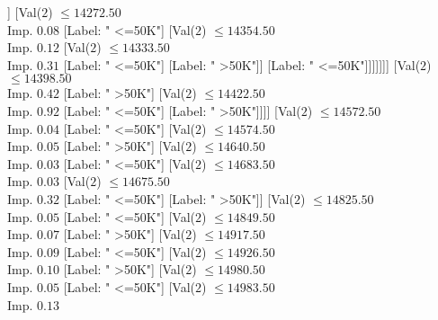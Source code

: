 \documentclass[margin=10pt]{standalone}
\begin{document}
\begin{forest}
																														[Label: " >50K"]]
																													[Val($2$) $ \leq 14272.50$ \\ Imp. $0.08$
																														[Label: " <=50K"]
																														[Val($2$) $ \leq 14354.50$ \\ Imp. $0.12$
																															[Val($2$) $ \leq 14333.50$ \\ Imp. $0.31$
																																[Label: " <=50K"]
																																[Label: " >50K"]]
																															[Label: " <=50K"]]]]]]]
																									[Val($2$) $ \leq 14398.50$ \\ Imp. $0.42$
																										[Label: " >50K"]
																										[Val($2$) $ \leq 14422.50$ \\ Imp. $0.92$
																											[Label: " <=50K"]
																											[Label: " >50K"]]]]
																								[Val($2$) $ \leq 14572.50$ \\ Imp. $0.04$
																									[Label: " <=50K"]
																									[Val($2$) $ \leq 14574.50$ \\ Imp. $0.05$
																										[Label: " >50K"]
																										[Val($2$) $ \leq 14640.50$ \\ Imp. $0.03$
																											[Label: " <=50K"]
																											[Val($2$) $ \leq 14683.50$ \\ Imp. $0.03$
																												[Val($2$) $ \leq 14675.50$ \\ Imp. $0.32$
																													[Label: " <=50K"]
																													[Label: " >50K"]]
																												[Val($2$) $ \leq 14825.50$ \\ Imp. $0.05$
																													[Label: " <=50K"]
																													[Val($2$) $ \leq 14849.50$ \\ Imp. $0.07$
																														[Label: " >50K"]
																														[Val($2$) $ \leq 14917.50$ \\ Imp. $0.09$
																															[Label: " <=50K"]
																															[Val($2$) $ \leq 14926.50$ \\ Imp. $0.10$
																																[Label: " >50K"]
																																[Val($2$) $ \leq 14980.50$ \\ Imp. $0.05$
																																	[Label: " <=50K"]
																																	[Val($2$) $ \leq 14983.50$ \\ Imp. $0.13$

\end{forest}
\end{document}

